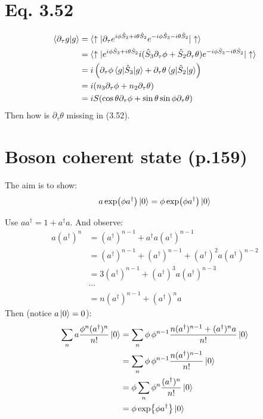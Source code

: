 \documentclass{article}
\begin{document}
\section{Eq. 3.52}

\begin{align}
    \braket{\partial_\tau g|g} 
    &= \braket{\uparrow|
        \partial_\tau e^{i\phi\hat{S}_3+i\theta\hat{S}_2}
        e^{-i\phi\hat{S}_3-i\theta\hat{S}_2}
        |\uparrow}
    \nonumber\\
    &= \braket{\uparrow|
        e^{i\phi\hat{S}_3+i\theta\hat{S}_2}
        i (\hat{S}_3\partial_\tau\phi + \hat{S}_2\partial_\tau\theta)
        e^{-i\phi\hat{S}_3-i\theta\hat{S}_2}
        |\uparrow }
    \nonumber\\
    &= i\left(\partial_\tau\phi\braket{g|\hat{S}_3|g} +
        \partial_\tau\theta\braket{g|\hat{S}_2|g} \right)
    \nonumber\\
    &= i(n_3\partial_\tau\phi + n_2 \partial_\tau\theta)
    \nonumber\\
    &= i S(\cos{\theta}\partial_\tau\phi + \sin{\theta}\sin{\phi}\partial_\tau\theta)
\end{align}
Then how is $\partial_\tau\theta$ missing in (3.52).

\section{Boson coherent state (p.159)}

The aim is to show:
\begin{equation}
    a \exp(\phi a^\dagger) \ket{0} = \phi\exp(\phi a^\dagger)\ket{0}
\end{equation}

Use $aa^\dagger = 1+ a^\dagger a$. And observe:
\begin{align*}
    a(a^\dagger)^n &= (a^\dagger)^{n-1}+ a^\dagger a (a^\dagger)^{n-1} \\
    &= (a^\dagger)^{n-1}+ (a^\dagger)^{n-1}+ (a^\dagger)^2 a (a^\dagger)^{n-2}
    \\
    &= 3(a^\dagger)^{n-1} + (a^\dagger)^3 a (a^\dagger)^{n-3} \\
    &\cdots \\
    &= n (a^\dagger)^{n-1} + (a^\dagger)^{n} a
\end{align*}
Then (notice $a\ket{0}=0$):
\begin{align*}
    \sum_n a \frac{\phi^n (a^\dagger)^n}{n!}\ket{0} 
    &= \sum_n \phi\, \phi^{n-1} \frac{n(a^\dagger)^{n-1}+(a^\dagger)^n a}{n!}\ket{0}\\
    &= \sum_n \phi\, \phi^{n-1} \frac{n(a^\dagger)^{n-1}}{n!}\ket{0} \\
    &= \phi\sum_n \phi^{n} \frac{(a^\dagger)^{n}}{n!}\ket{0} \\
    &= \phi\exp{\phi a^\dagger}\ket{0}
\end{align*}
\end{document}

